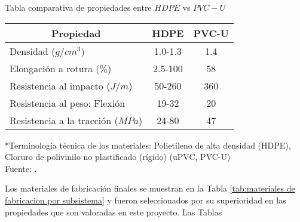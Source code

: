 \begin{mytable}[H]
	\centering
	\caption{Tabla comparativa de propiedades entre $HDPE$ vs $PVC-U$}
	\label{tab:tabla comparativa de propiedades entre hdpe vs pvcu}
	\begin{tabular}{|l|c|c|}
		\hline
		\multicolumn{1}{|c|}{\textbf{Propiedad}} & \textbf{HDPE} & \textbf{PVC-U} \\ \hline
		Densidad ($g/cm^3$) & 1.0-1.3 & 1.4 \\ \hline
		Elongación a rotura ($\%$) & 2.5-100 & 58 \\ \hline
		Resistencia al impacto ($J/m$) & 50-260 & 360 \\ \hline
		Resistencia al peso: Flexión & 19-32 & 20 \\ \hline
		Resistencia a la tracción ($MPa$) & 24-80 & 47 \\ \hline
	\end{tabular}
	\begin{flushleft}
		*Terminología técnica de los materiales: Polietileno de alta densidad (HDPE), Cloruro de polivinilo no plastificado (rígido) (uPVC, PVC-U)\\		
		Fuente: \cite{Brydson1999,Berins1991,Harper2000,MakeItFrom2020}.
	\end{flushleft}
\end{mytable}


Los materiales de fabricación finales se muestran en la Tabla \ref{tab:materiales de fabricacion por subsistema} y fueron seleccionados por su superioridad en las propiedades que son valoradas en este proyecto. Las Tablas 

